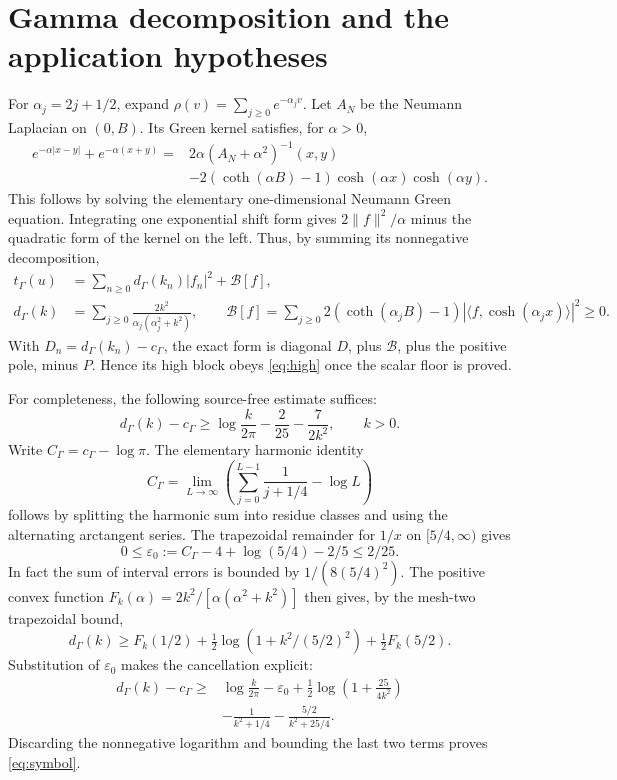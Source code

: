 \documentclass[11pt]{article}
\newcommand{\norm}[1]{\lVert#1\rVert}
\newcommand{\ip}[2]{\langle#1,#2\rangle}
\begin{document}
\section{Gamma decomposition and the application hypotheses}\label{app:gamma}
For $\alpha_j=2j+1/2$, expand $\rho(v)=\sum_{j\ge0}e^{-\alpha_jv}$. Let $A_N$ be the Neumann Laplacian on $(0,B)$. Its Green kernel satisfies, for $\alpha>0$,
\begin{align*}
 e^{-\alpha|x-y|}+e^{-\alpha(x+y)}
 ={}&2\alpha(A_N+\alpha^2)^{-1}(x,y)\\
 &-2(\coth(\alpha B)-1)\cosh(\alpha x)\cosh(\alpha y).
\end{align*}
This follows by solving the elementary one-dimensional Neumann Green equation. Integrating one exponential shift form gives $2\norm f^2/\alpha$ minus the quadratic form of the kernel on the left. Thus, by summing its nonnegative decomposition,
\begin{align}
 t_\Gamma(u)&=\sum_{n\ge0}d_\Gamma(k_n)|f_n|^2+\mathcal B[f],\nonumber\\
 d_\Gamma(k)&=\sum_{j\ge0}\frac{2k^2}{\alpha_j(\alpha_j^2+k^2)},\qquad
 \mathcal B[f]=\sum_{j\ge0}2(\coth(\alpha_jB)-1)
       |\ip f{\cosh(\alpha_jx)}|^2\ge0.\label{eq:decomp}
\end{align}
With $D_n=d_\Gamma(k_n)-c_\Gamma$, the exact form is diagonal $D$, plus $\mathcal B$, plus the positive pole, minus $P$. Hence its high block obeys \eqref{eq:high} once the scalar floor is proved.

For completeness, the following source-free estimate suffices:
\begin{equation}
 d_\Gamma(k)-c_\Gamma\ge\log\frac{k}{2\pi}-\frac2{25}-\frac7{2k^2},\qquad k>0.
 \label{eq:symbol}
\end{equation}
Write $C_\Gamma=c_\Gamma-\log\pi$. The elementary harmonic identity
\[
 C_\Gamma=\lim_{L\to\infty}\left(\sum_{j=0}^{L-1}\frac1{j+1/4}-\log L\right)
\]
follows by splitting the harmonic sum into residue classes and using the alternating arctangent series. The trapezoidal remainder for $1/x$ on $[5/4,\infty)$ gives
\[
 0\le\varepsilon_0:=C_\Gamma-4+\log(5/4)-2/5\le2/25.
\]
In fact the sum of interval errors is bounded by $1/(8(5/4)^2)$. The positive convex function
$F_k(\alpha)=2k^2/[\alpha(\alpha^2+k^2)]$ then gives, by the mesh-two trapezoidal bound,
\[
 d_\Gamma(k)\ge F_k(1/2)+\tfrac12\log(1+k^2/(5/2)^2)+\tfrac12F_k(5/2).
\]
Substitution of $\varepsilon_0$ makes the cancellation explicit:
\begin{align*}
 d_\Gamma(k)-c_\Gamma\ge{}&\log\frac{k}{2\pi}-\varepsilon_0
 +\frac12\log\left(1+\frac{25}{4k^2}\right)\\
 &-\frac1{k^2+1/4}-\frac{5/2}{k^2+25/4}.
\end{align*}
Discarding the nonnegative logarithm and bounding the last two terms proves \eqref{eq:symbol}.
\end{document}
